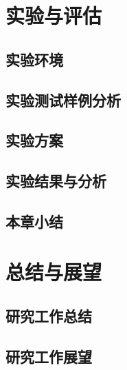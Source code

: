 
\section{实验与评估}        %
\subsection{实验环境}
\subsection{实验测试样例分析}
\subsection{实验方案}
\subsection{实验结果与分析}
\subsection{本章小结}

\section{总结与展望}        %
\subsection{研究工作总结}
\subsection{研究工作展望}